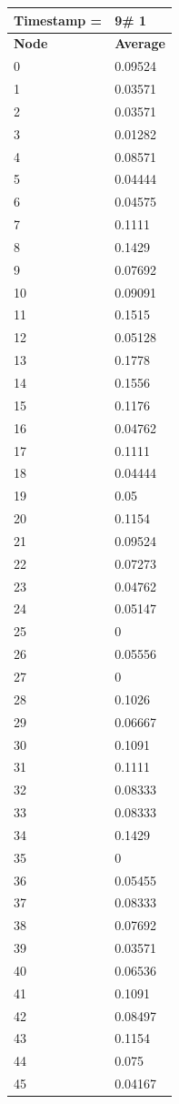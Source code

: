 \begin{tabular}{|l||l|}
\hline
\textbf{Timestamp =} & \textbf{9}\# 1\\\hline
	\textbf{Node} & \textbf{Average} \\ \hline
\hline
	0 & 0.09524 \\ \hline
	1 & 0.03571 \\ \hline
	2 & 0.03571 \\ \hline
	3 & 0.01282 \\ \hline
	4 & 0.08571 \\ \hline
	5 & 0.04444 \\ \hline
	6 & 0.04575 \\ \hline
	7 & 0.1111 \\ \hline
	8 & 0.1429 \\ \hline
	9 & 0.07692 \\ \hline
	10 & 0.09091 \\ \hline
	11 & 0.1515 \\ \hline
	12 & 0.05128 \\ \hline
	13 & 0.1778 \\ \hline
	14 & 0.1556 \\ \hline
	15 & 0.1176 \\ \hline
	16 & 0.04762 \\ \hline
	17 & 0.1111 \\ \hline
	18 & 0.04444 \\ \hline
	19 & 0.05 \\ \hline
	20 & 0.1154 \\ \hline
	21 & 0.09524 \\ \hline
	22 & 0.07273 \\ \hline
	23 & 0.04762 \\ \hline
	24 & 0.05147 \\ \hline
	25 & 0 \\ \hline
	26 & 0.05556 \\ \hline
	27 & 0 \\ \hline
	28 & 0.1026 \\ \hline
	29 & 0.06667 \\ \hline
	30 & 0.1091 \\ \hline
	31 & 0.1111 \\ \hline
	32 & 0.08333 \\ \hline
	33 & 0.08333 \\ \hline
	34 & 0.1429 \\ \hline
	35 & 0 \\ \hline
	36 & 0.05455 \\ \hline
	37 & 0.08333 \\ \hline
	38 & 0.07692 \\ \hline
	39 & 0.03571 \\ \hline
	40 & 0.06536 \\ \hline
	41 & 0.1091 \\ \hline
	42 & 0.08497 \\ \hline
	43 & 0.1154 \\ \hline
	44 & 0.075 \\ \hline
	45 & 0.04167 \\ \hline
\end{tabular}
